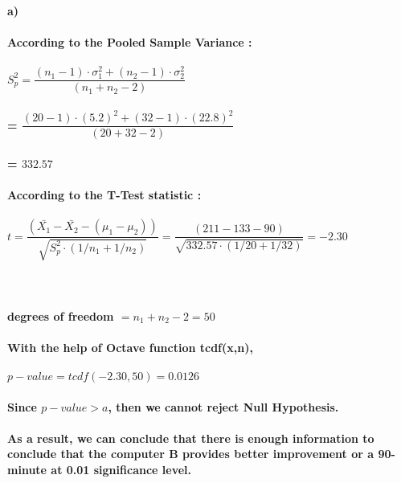 \documentclass[12pt]{article}
\begin{document}
\paragraph{a)
\\\\  According to the Pooled Sample Variance : 
\\\\ $ S_{p}^2 = \dfrac{(n_{1}-1) \cdot \sigma_{1}^2 + (n_{2}-1)\cdot \sigma_{2}^2}{(n_{1} + n_{2} -2 )}$ 
\\\\ {\hspace*{25}}= $ \dfrac{(20-1) \cdot (5.2)^2 + (32-1) \cdot (22.8)^2}{(20+32-2)} $
\\\\ {\hspace*{22}} = $332.57$
\newpage
\\\\  According to the T-Test statistic :
\\\\ $ t= \dfrac{(\bar{X_{1}} - \bar{X_{2}} - (\mu_{1} - \mu_{2}))}{\sqrt{S_{p}^2 \cdot (1/n_{1} + 1/n_{2})}} = \dfrac{(211 - 133 - 90)}{\sqrt{332.57 \cdot (1/20 + 1/32)}}  = -2.30$\\\\ 
\\\\ degrees of freedom $= n_{1} + n_{2} -2 = 50 $
\\\\ With the help of Octave function tcdf(x,n),
\\\\ {\hspace*{25}} $p-value = tcdf(-2.30, 50) = 0.0126$
\\\\ Since  $p-value  > a $, then we cannot reject Null Hypothesis.
\\\\ As a result, we can conclude that there is enough information to conclude that the computer B provides better improvement or a 90-minute at 0.01 significance level.
}
\end{document}
